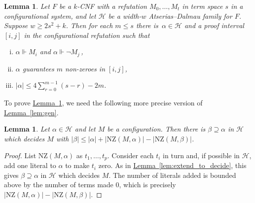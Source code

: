 \documentclass[11pt]{article}
\numberwithin{equation}{section}
\newtheorem{lemma}[theorem]{Lemma}
\theoremstyle{definition}
\theoremstyle{plain}
\newcommand{\expref}[2]{\hyperref[#2]{#1~\ref{#2}}}
\newcommand\calH{\mathcal{H}}
\newcommand\rmNZ{\mathrm{NZ}}
\begin{document}
\begin{lemma}\label{lem:main-prime}
Let $F$ be a $k$-CNF with a refutation $M_0,\ldots,M_t$ in term space $s$ 
in a configurational system,
and let $\calH$ be a width-$w$ Atserias--Dalmau family for $F$.
Suppose $w \ge 2s^2+k$.
Then for each $m \le s$ there is~$\alpha \in \calH$ 
and a proof interval $[i,j]$ in the configurational refutation such that
\begin{enumerate}[(i)]
\item 
$\alpha \Vdash M_{i}$ and  $\alpha \Vdash \neg M_{j}$\,,
\item 
$\alpha$ guarantees $m$ non-zeroes in $[i,j]$,
\item 
$|\alpha| \le 4 \sum_{r=0}^{m-1} (s-r) -2m$.
\end{enumerate}
\end{lemma}

To prove \expref{Lemma}{lem:main-prime},  
we need the following more precise version of \expref{Lemma}{lem:gen}.

\begin{lemma} \label{lem:extend_NZ}
Let $\alpha \in \calH$ and let $M$ be a configuration. 
Then there is $\beta \supseteq \alpha$ in $\calH$ 
which decides $M$ with
$|\beta| \le |\alpha|+|\rmNZ(M,\alpha)|-|\rmNZ(M, \beta)|$.
\end{lemma}

\begin{proof}
List $\rmNZ(M, \alpha)$ as $t_1, \dots, t_p$.
Consider each $t_i$ in turn and, if possible in $\calH$, add one literal to $\alpha$ to make $t_i$ zero.
As in \expref{Lemma}{lem:extend_to_decide},
this gives $\beta \supseteq \alpha$ in $\calH$ which decides $M$.
The number of literals added is bounded above by the number
of terms made $0$, which is precisely $|\rmNZ(M,\alpha)|-|\rmNZ(M, \beta)|$. 
\end{proof}
\end{document}
